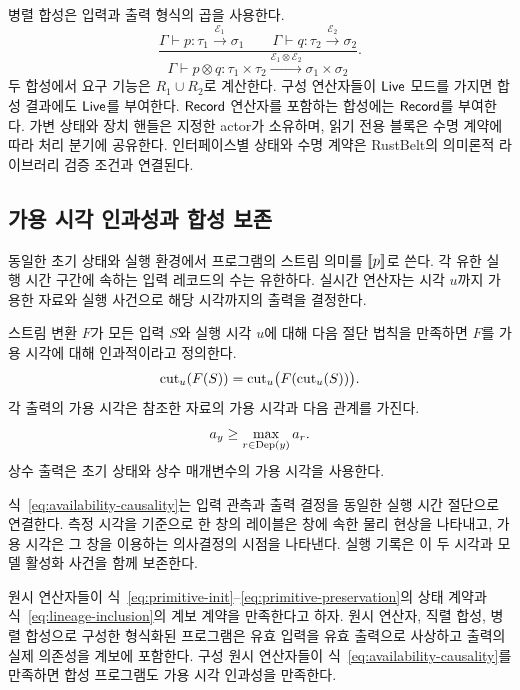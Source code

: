 병렬 합성은 입력과 출력 형식의 곱을 사용한다.
\begin{equation}
 \frac{
 \Gamma\vdash p:\tau_1\xrightarrow{\mathcal E_1}\sigma_1
 \qquad
 \Gamma\vdash q:\tau_2\xrightarrow{\mathcal E_2}\sigma_2
 }{
 \Gamma\vdash p\otimes q:\tau_1\times\tau_2
 \xrightarrow{\mathcal E_1\otimes\mathcal E_2}
 \sigma_1\times\sigma_2
 }.
 \label{eq:typing-parallel}
\end{equation}
두 합성에서 요구 기능은 $R_1\cup R_2$로 계산한다.
구성 연산자들이 $\mathsf{Live}$ 모드를 가지면 합성 결과에도 $\mathsf{Live}$를 부여한다.
$\mathsf{Record}$ 연산자를 포함하는 합성에는 $\mathsf{Record}$를 부여한다.
가변 상태와 장치 핸들은 지정한 actor가 소유하며, 읽기 전용 블록은
수명 계약에 따라 처리 분기에 공유한다. 인터페이스별 상태와 수명 계약은
RustBelt의 의미론적 라이브러리 검증 조건과 연결된다\citep{rustbelt}.

\subsection{가용 시각 인과성과 합성 보존}

동일한 초기 상태와 실행 환경에서 프로그램의 스트림 의미를 $\mathopen{[\![}p\mathclose{]\!]}$로 쓴다.
각 유한 실행 시간 구간에 속하는 입력 레코드의 수는 유한하다.
실시간 연산자는 시각 $u$까지 가용한 자료와 실행 사건으로
해당 시각까지의 출력을 결정한다.

\begin{definition}[가용 시각 인과성]
스트림 변환 $F$가 모든 입력 $S$와 실행 시각 $u$에 대해
다음 절단 법칙을 만족하면 $F$를 가용 시각에 대해 인과적이라고 정의한다.
\begin{equation}
 \operatorname{cut}_u(F(S))=\operatorname{cut}_u\bigl(F(\operatorname{cut}_u(S))\bigr).
 \label{eq:availability-causality}
\end{equation}
각 출력의 가용 시각은 참조한 자료의 가용 시각과 다음 관계를 가진다.
\begin{equation}
 a_y\ge\max_{r\in\operatorname{Dep}(y)}a_r.
 \label{eq:availability-dependencies}
\end{equation}
상수 출력은 초기 상태와 상수 매개변수의 가용 시각을 사용한다.
\end{definition}

식~\eqref{eq:availability-causality}는 입력 관측과 출력 결정을 동일한
실행 시간 절단으로 연결한다. 측정 시각을 기준으로 한 창의 레이블은
창에 속한 물리 현상을 나타내고, 가용 시각은 그 창을 이용하는 의사결정의 시점을 나타낸다.
실행 기록은 이 두 시각과 모델 활성화 사건을 함께 보존한다.

\begin{proposition}
원시 연산자들이 식~\eqref{eq:primitive-init}--\eqref{eq:primitive-preservation}의
상태 계약과 식~\eqref{eq:lineage-inclusion}의 계보 계약을 만족한다고 하자.
원시 연산자, 직렬 합성, 병렬 합성으로 구성한 형식화된 프로그램은
유효 입력을 유효 출력으로 사상하고 출력의 실제 의존성을 계보에 포함한다.
구성 원시 연산자들이 식~\eqref{eq:availability-causality}를 만족하면
합성 프로그램도 가용 시각 인과성을 만족한다.
\end{proposition}

